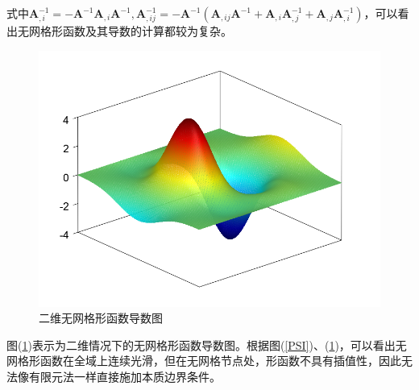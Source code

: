 式中$\pmb A_{,i}^{-1}=-\pmb A^{-1}\pmb A_{,i}\pmb A^{-1},\pmb A_{,ij}^{-1}=-\pmb A^{-1}(\pmb A_{,ij}\pmb A^{-1}+\pmb A_{,i}\pmb A_{,j}^{-1}+\pmb A_{,j}\pmb A_{,i}^{-1})$，可以看出无网格形函数及其导数的计算都较为复杂。\par
\begin{figure}[!h]
    \centering
\includegraphics[scale=0.3]{figure/detalpsi.png}
\caption{二维无网格形函数导数图}\label{detalpsi}
\end{figure}\newpage
图(\ref{detalpsi})表示为二维情况下的无网格形函数导数图。根据图(\ref{PSI})、(\ref{detalpsi})，可以看出无网格形函数在全域上连续光滑，但在无网格节点处，形函数不具有插值性，因此无法像有限元法一样直接施加本质边界条件。
